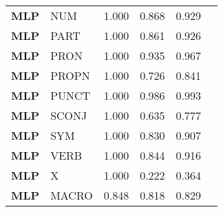 \begin{table}
\begin{tabular}{|l|l|l|l|l|l|}
\textbf{MLP} & NUM & 1.000 & 0.868 & 0.929 \\
\textbf{MLP} & PART & 1.000 & 0.861 & 0.926 \\
\textbf{MLP} & PRON & 1.000 & 0.935 & 0.967 \\
\textbf{MLP} & PROPN & 1.000 & 0.726 & 0.841 \\
\textbf{MLP} & PUNCT & 1.000 & 0.986 & 0.993 \\
\textbf{MLP} & SCONJ & 1.000 & 0.635 & 0.777 \\
\textbf{MLP} & SYM & 1.000 & 0.830 & 0.907 \\
\textbf{MLP} & VERB & 1.000 & 0.844 & 0.916 \\
\textbf{MLP} & X & 1.000 & 0.222 & 0.364 \\
\textbf{MLP} & MACRO & 0.848 & 0.818 & 0.829 \\
\bottomrule
\end{tabular}
\end{table}
